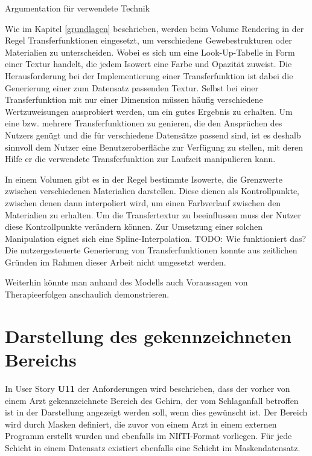 Argumentation für verwendete Technik

Wie im Kapitel \ref{grundlagen} beschrieben, werden beim Volume Rendering in der Regel Transferfunktionen eingesetzt, um verschiedene Gewebestrukturen oder Materialien zu unterscheiden. Wobei es sich um eine Look-Up-Tabelle in Form einer Textur handelt, die jedem Isowert eine Farbe und Opazität zuweist.
Die Herausforderung bei der Implementierung einer Transferfunktion ist dabei die Generierung einer zum Datensatz passenden Textur. Selbst bei einer Transferfunktion mit nur einer Dimension müssen häufig verschiedene Wertzuweisungen ausprobiert werden, um ein gutes Ergebnis zu erhalten.
Um eine bzw. mehrere Transferfunktionen zu genieren, die den Ansprüchen des Nutzers genügt und die für verschiedene Datensätze passend sind, ist es deshalb sinnvoll dem Nutzer eine Benutzeroberfläche zur Verfügung zu stellen, mit deren Hilfe er die verwendete Transferfunktion zur Laufzeit manipulieren kann. 

In einem Volumen gibt es in der Regel bestimmte Isowerte, die Grenzwerte zwischen verschiedenen Materialien darstellen. Diese dienen als Kontrollpunkte, zwischen denen dann interpoliert wird, um einen Farbverlauf zwischen den Materialien zu erhalten. 
Um die Transfertextur zu beeinflussen muss der Nutzer diese Kontrollpunkte verändern können. Zur Umsetzung einer solchen Manipulation eignet sich eine Spline-Interpolation. 
TODO:
Wie funktioniert das?
Die nutzergesteuerte Generierung von Transferfunktionen konnte aus zeitlichen Gründen im Rahmen dieser Arbeit nicht umgesetzt werden.

Weiterhin könnte man anhand des Modells auch Voraussagen von Therapieerfolgen anschaulich demonstrieren.

\section{Darstellung des gekennzeichneten Bereichs}
\label{maske}


In User Story \textbf{U11} der Anforderungen wird beschrieben, dass der vorher von einem Arzt gekennzeichnete Bereich des Gehirn, der vom Schlaganfall betroffen ist in der Darstellung angezeigt werden soll, wenn dies gewünscht ist. 
Der Bereich wird durch Masken definiert, die zuvor von einem Arzt in einem externen Programm erstellt wurden und ebenfalls im NIfTI-Format vorliegen. Für jede Schicht in einem Datensatz existiert ebenfalls eine Schicht im Maskendatensatz. 

